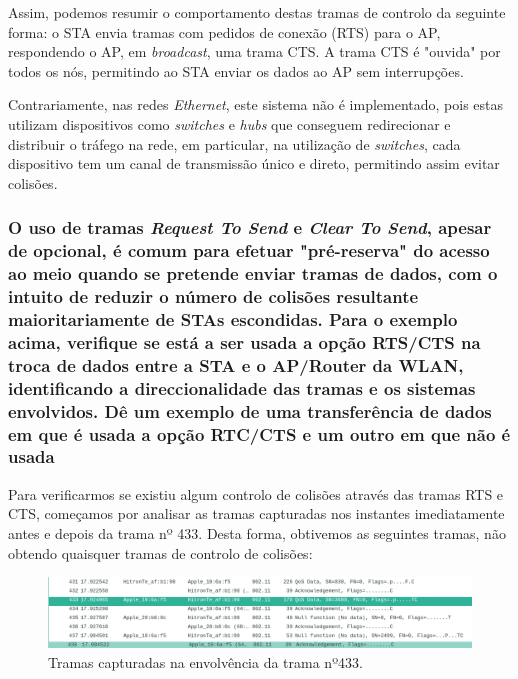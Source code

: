     \par Assim, podemos resumir o comportamento destas tramas de controlo da seguinte forma: o STA envia tramas com pedidos de conexão (RTS) para o AP, respondendo o AP, em \textit{broadcast}, uma trama CTS. A trama CTS é "ouvida"\xspace por todos os nós, permitindo ao STA enviar os dados ao AP sem interrupções.

    \par Contrariamente, nas redes \textit{Ethernet}, este sistema não é implementado, pois estas utilizam dispositivos como \textit{switches} e \textit{hubs} que conseguem redirecionar e distribuir o tráfego na rede, em particular, na utilização de \textit{switches}, cada dispositivo tem um canal de transmissão único e direto, permitindo assim evitar colisões.





\vspace{10pt}
\subsubsection{O uso de tramas \textit{Request To Send} e \textit{Clear To Send}, apesar de opcional, é comum para efetuar "pré-reserva" do acesso ao meio quando se pretende enviar tramas de dados, com o intuito de reduzir o número de colisões resultante maioritariamente de STAs escondidas. Para o exemplo acima, verifique se está a ser usada a opção RTS/CTS na troca de dados entre a STA e o AP/Router da WLAN, identificando a direccionalidade das tramas e os sistemas envolvidos. Dê um exemplo de uma transferência de dados em que é usada a opção RTC/CTS e um outro em que não é usada}

    \par Para verificarmos se existiu algum controlo de colisões através das tramas RTS e CTS, começamos por analisar as tramas capturadas nos instantes imediatamente antes e depois da trama nº 433. Desta forma, obtivemos as seguintes tramas, não obtendo quaisquer tramas de controlo de colisões:
    
    \begin{figure}[H]
    \centering
    \includegraphics[width=500pt]{Prints/Questao7/questao7-Ultima.png}
    \caption{Tramas capturadas na envolvência da trama nº433.} \label{questao7-redor}
    \end{figure}
    
